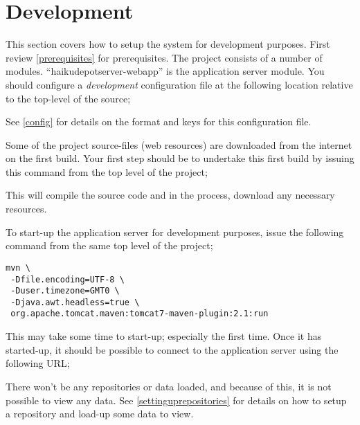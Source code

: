 
\section{Development}

This section covers how to setup the system for development purposes.  First review \ref{prerequisites} for prerequisites.  The project consists of a number of modules.  ``haikudepotserver-webapp'' is the application server module.  You should configure a {\it development} configuration file at the following location relative to the top-level of the source;


See \ref{config} for details on the format and keys for this configuration file.

Some of the project source-files (web resources) are downloaded from the internet on the first build.  Your first step should be to undertake this first build by issuing this command from the top level of the project;


This will compile the source code and in the process, download any necessary resources.

To start-up the application server for development purposes, issue the following command from the same top level of the project;

\begin{verbatim}
mvn \
 -Dfile.encoding=UTF-8 \
 -Duser.timezone=GMT0 \
 -Djava.awt.headless=true \
 org.apache.tomcat.maven:tomcat7-maven-plugin:2.1:run
\end{verbatim}

This may take some time to start-up; especially the first time.  Once it has started-up, it should be possible to connect to the application server using the following URL;


There won't be any repositories or data loaded, and because of this, it is not possible to view any data.  See \ref{settinguprepositories} for details on how to setup a repository and load-up some data to view.